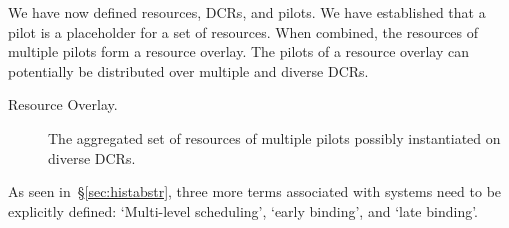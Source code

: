 \documentclass{sig-alternate}
\begin{document}




We have now defined resources, DCRs, and pilots. We have established that a
pilot is a placeholder for a set of resources. When combined, the resources of
multiple pilots form a resource overlay. The pilots of a resource overlay can
potentially be distributed over multiple and diverse DCRs.



\begin{description}
\item[Resource Overlay.] The aggregated set of resources of multiple pilots possibly instantiated on diverse DCRs.
\end{description}

As seen in~\S\ref{sec:histabstr}, three more terms associated with \pilot
systems need to be explicitly defined: `Multi-level scheduling', `early
binding', and `late binding'.


\end{document}
